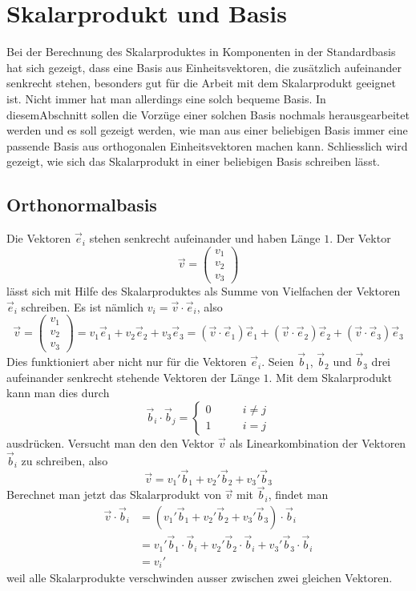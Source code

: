 %
%
%
\section{Skalarprodukt und Basis\label{section:orthonormalbasis}}
Bei der Berechnung des Skalarproduktes in Komponenten in der Standardbasis
hat sich gezeigt, dass eine Basis aus Einheitsvektoren, die zusätzlich
aufeinander senkrecht stehen, besonders gut für die Arbeit mit dem
Skalarprodukt geeignet ist.
Nicht immer hat man allerdings eine solch bequeme Basis.
In diesemAbschnitt sollen die Vorzüge einer solchen Basis nochmals
herausgearbeitet werden und es soll gezeigt werden, wie man aus
einer beliebigen Basis immer eine passende Basis aus orthogonalen
Einheitsvektoren machen kann.
Schliesslich wird gezeigt, wie sich das Skalarprodukt in einer beliebigen
Basis schreiben lässt.

\subsection{Orthonormalbasis}
Die Vektoren $\vec e_i$ stehen senkrecht aufeinander und haben
Länge $1$.
Der Vektor
\[
\vec v
=
\begin{pmatrix}v_1\\v_2\\v_3\end{pmatrix}
\]
lässt sich mit Hilfe des Skalarproduktes als Summe von Vielfachen
der Vektoren $\vec e_i$ schreiben.
Es ist nämlich $v_i=\vec v\cdot\vec e_i$, also
\[
\vec v
=
\begin{pmatrix}v_1\\v_2\\v_3\end{pmatrix}
=
v_1\vec e_1
+
v_2\vec e_2
+
v_3\vec e_3
=
(\vec v\cdot \vec e_1)\vec e_1
+
(\vec v\cdot \vec e_2)\vec e_2
+
(\vec v\cdot \vec e_3)\vec e_3
\]
Dies funktioniert aber nicht nur für die Vektoren $\vec e_i$.
Seien $\vec b_1$, $\vec b_2$ und $\vec b_3$ drei aufeinander senkrecht
stehende Vektoren der Länge $1$.
Mit dem Skalarprodukt kann man dies durch
\[
\vec b_i\cdot\vec b_j=\begin{cases}
0&\qquad i\ne j\\
1&\qquad i=j
\end{cases}
\]
ausdrücken.
Versucht man den den Vektor $\vec v$ als Linearkombination
der Vektoren $\vec b_i$ zu schreiben, also
\[
\vec v
=
v_1'\vec b_1
+
v_2'\vec b_2
+
v_3'\vec b_3
\]
Berechnet man jetzt das Skalarprodukt von $\vec v$ mit $\vec b_i$,
findet man
\begin{align*}
\vec v\cdot \vec b_i
&=
(
v_1'\vec b_1
+
v_2'\vec b_2
+
v_3'\vec b_3
)\cdot
\vec b_i
\\
&=
v_1'\vec b_1\cdot\vec b_i
+
v_2'\vec b_2\cdot\vec b_i
+
v_3'\vec b_3\cdot\vec b_i
\\
&=v_i'
\end{align*}
weil alle Skalarprodukte verschwinden ausser zwischen
zwei gleichen Vektoren.

